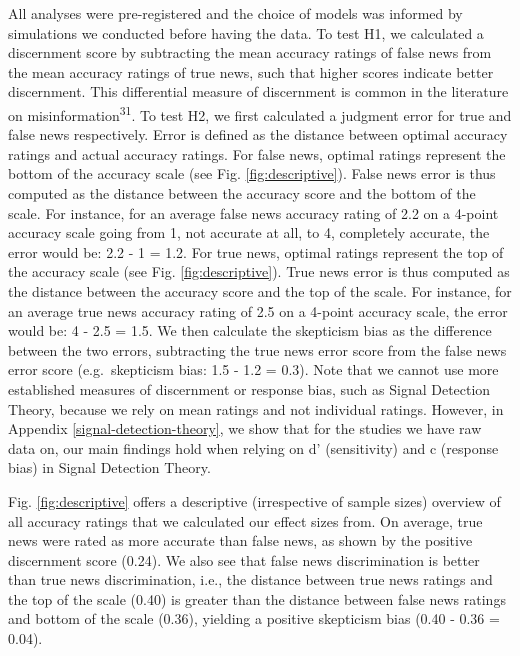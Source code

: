 \documentclass[
  doc,floatsintext]{apa6}
\begin{document}
All analyses were pre-registered and the choice of models was informed by simulations we conducted before having the data. To test H1, we calculated a discernment score by subtracting the mean accuracy ratings of false news from the mean accuracy ratings of true news, such that higher scores indicate better discernment. This differential measure of discernment is common in the literature on misinformation\textsuperscript{31}. To test H2, we first calculated a judgment error for true and false news respectively. Error is defined as the distance between optimal accuracy ratings and actual accuracy ratings. For false news, optimal ratings represent the bottom of the accuracy scale (see Fig. \ref{fig:descriptive}). False news error is thus computed as the distance between the accuracy score and the bottom of the scale. For instance, for an average false news accuracy rating of 2.2 on a 4-point accuracy scale going from 1, not accurate at all, to 4, completely accurate, the error would be: 2.2 - 1 = 1.2. For true news, optimal ratings represent the top of the accuracy scale (see Fig. \ref{fig:descriptive}). True news error is thus computed as the distance between the accuracy score and the top of the scale. For instance, for an average true news accuracy rating of 2.5 on a 4-point accuracy scale, the error would be: 4 - 2.5 = 1.5. We then calculate the skepticism bias as the difference between the two errors, subtracting the true news error score from the false news error score (e.g.~skepticism bias: 1.5 - 1.2 = 0.3). Note that we cannot use more established measures of discernment or response bias, such as Signal Detection Theory, because we rely on mean ratings and not individual ratings. However, in Appendix \ref{signal-detection-theory}, we show that for the studies we have raw data on, our main findings hold when relying on d' (sensitivity) and c (response bias) in Signal Detection Theory.

Fig. \ref{fig:descriptive} offers a descriptive (irrespective of sample sizes) overview of all accuracy ratings that we calculated our effect sizes from. On average, true news were rated as more accurate than false news, as shown by the positive discernment score (0.24). We also see that false news discrimination is better than true news discrimination, i.e., the distance between true news ratings and the top of the scale (0.40) is greater than the distance between false news ratings and bottom of the scale (0.36), yielding a positive skepticism bias (0.40 - 0.36 = 0.04).
\end{document}
